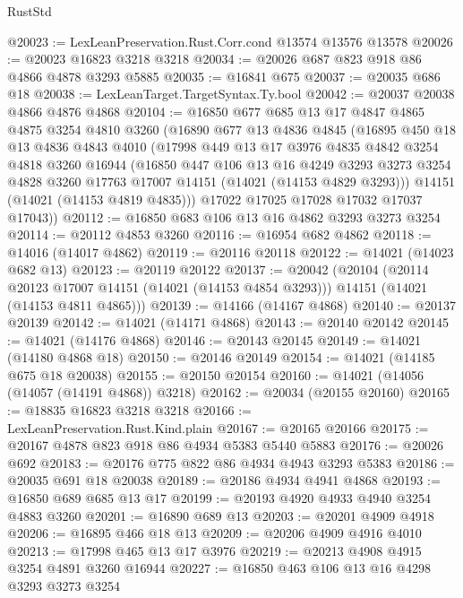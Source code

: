 \begin{lexlean}{RustStd}
\begin{coremodule}
@20023 := LexLeanPreservation.Rust.Corr.cond @13574 @13576 @13578
@20026 := @20023 @16823 @3218 @3218
@20034 := @20026 @687 @823 @918 @86 @4866 @4878 @3293 @5885
@20035 := @16841 @675
@20037 := @20035 @686 @18
@20038 := LexLeanTarget.TargetSyntax.Ty.bool
@20042 := @20037 @20038 @4866 @4876 @4868
@20104 := @16850
    @677
    @685
    @13
    @17
    @4847
    @4865
    @4875
    @3254
    @4810
    @3260
    (@16890
      @677
      @13
      @4836
      @4845
      (@16895
        @450
        @18
        @13
        @4836
        @4843
        @4010
        (@17998
          @449
          @13
          @17
          @3976
          @4835
          @4842
          @3254
          @4818
          @3260
          @16944
          (@16850
            @447
            @106
            @13
            @16
            @4249
            @3293
            @3273
            @3254
            @4828
            @3260
            @17763
            @17007
            @14151
            (@14021 (@14153 @4829 @3293)))
          @14151
          (@14021 (@14153 @4819 @4835)))
        @17022
        @17025
        @17028
        @17032
        @17037
        @17043))
@20112 := @16850 @683 @106 @13 @16 @4862 @3293 @3273 @3254
@20114 := @20112 @4853 @3260
@20116 := @16954 @682 @4862
@20118 := @14016 (@14017 @4862)
@20119 := @20116 @20118
@20122 := @14021 (@14023 @682 @13)
@20123 := @20119 @20122
@20137 := @20042
    (@20104
      (@20114 @20123 @17007 @14151 (@14021 (@14153 @4854 @3293)))
      @14151
      (@14021 (@14153 @4811 @4865)))
@20139 := @14166 (@14167 @4868)
@20140 := @20137 @20139
@20142 := @14021 (@14171 @4868)
@20143 := @20140 @20142
@20145 := @14021 (@14176 @4868)
@20146 := @20143 @20145
@20149 := @14021 (@14180 @4868 @18)
@20150 := @20146 @20149
@20154 := @14021 (@14185 @675 @18 @20038)
@20155 := @20150 @20154
@20160 := @14021 (@14056 (@14057 (@14191 @4868)) @3218)
@20162 := @20034 (@20155 @20160)
@20165 := @18835 @16823 @3218 @3218
@20166 := LexLeanPreservation.Rust.Kind.plain
@20167 := @20165 @20166
@20175 := @20167 @4878 @823 @918 @86 @4934 @5383 @5440 @5883
@20176 := @20026 @692
@20183 := @20176 @775 @822 @86 @4934 @4943 @3293 @5383
@20186 := @20035 @691 @18 @20038
@20189 := @20186 @4934 @4941 @4868
@20193 := @16850 @689 @685 @13 @17
@20199 := @20193 @4920 @4933 @4940 @3254 @4883 @3260
@20201 := @16890 @689 @13
@20203 := @20201 @4909 @4918
@20206 := @16895 @466 @18 @13
@20209 := @20206 @4909 @4916 @4010
@20213 := @17998 @465 @13 @17 @3976
@20219 := @20213 @4908 @4915 @3254 @4891 @3260 @16944
@20227 := @16850 @463 @106 @13 @16 @4298 @3293 @3273 @3254

\end{coremodule}
\end{lexlean}
